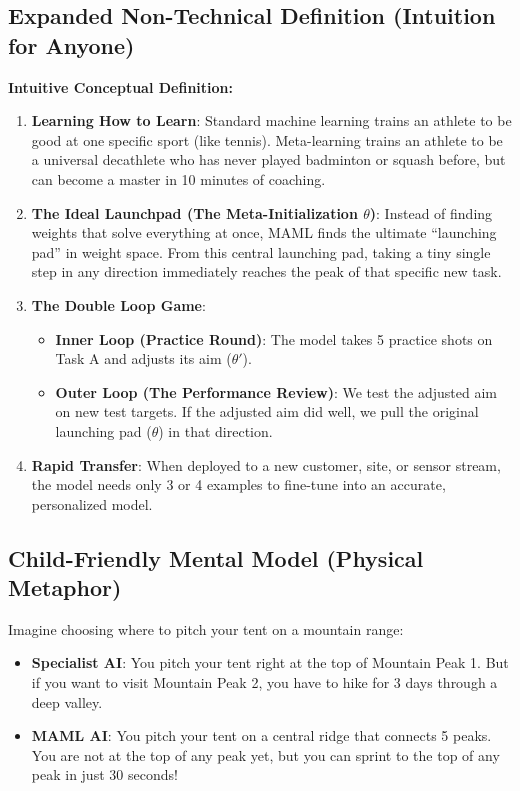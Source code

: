 \documentclass[11pt,a4paper]{article}
\theoremstyle{definition}
\begin{document}
\subsection{Expanded Non-Technical Definition (Intuition for Anyone)}
\textbf{Intuitive Conceptual Definition:}
\begin{enumerate}
    \item \textbf{Learning How to Learn}: Standard machine learning trains an athlete to be good at one specific sport (like tennis). Meta-learning trains an athlete to be a universal decathlete who has never played badminton or squash before, but can become a master in 10 minutes of coaching.
    \item \textbf{The Ideal Launchpad (The Meta-Initialization $\theta$)}: Instead of finding weights that solve everything at once, MAML finds the ultimate ``launching pad'' in weight space. From this central launching pad, taking a tiny single step in any direction immediately reaches the peak of that specific new task.
    \item \textbf{The Double Loop Game}:
    \begin{itemize}
        \item \textbf{Inner Loop (Practice Round)}: The model takes 5 practice shots on Task A and adjusts its aim ($\theta'$).
        \item \textbf{Outer Loop (The Performance Review)}: We test the adjusted aim on new test targets. If the adjusted aim did well, we pull the original launching pad ($\theta$) in that direction.
    \end{itemize}
    \item \textbf{Rapid Transfer}: When deployed to a new customer, site, or sensor stream, the model needs only 3 or 4 examples to fine-tune into an accurate, personalized model.
\end{enumerate}

\subsection{Child-Friendly Mental Model (Physical Metaphor)}
Imagine choosing where to pitch your tent on a mountain range:
\begin{itemize}
    \item \textbf{Specialist AI}: You pitch your tent right at the top of Mountain Peak 1. But if you want to visit Mountain Peak 2, you have to hike for 3 days through a deep valley.
    \item \textbf{MAML AI}: You pitch your tent on a central ridge that connects 5 peaks. You are not at the top of any peak yet, but you can sprint to the top of any peak in just 30 seconds!
\end{itemize}
\end{document}
